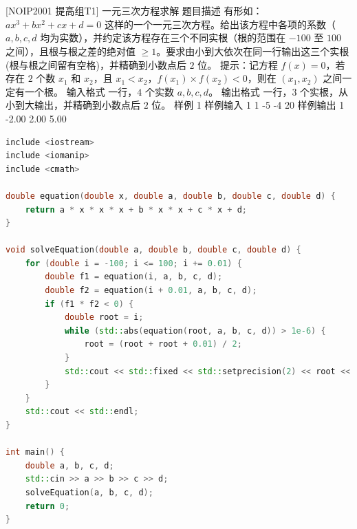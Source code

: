 \documentclass[12pt,twiside,a4paper]{ctexbook}
\numberwithin{chapter}{part}
\begin{document}
\section{}
 [NOIP2001 提高组T1] 一元三次方程求解
 题目描述
有形如：$a x^3 + b x^2 + c x + d = 0$  这样的一个一元三次方程。给出该方程中各项的系数（$a,b,c,d$ 均为实数），并约定该方程存在三个不同实根（根的范围在 $-100$ 至 $100$ 之间），且根与根之差的绝对值 $\ge 1$。要求由小到大依次在同一行输出这三个实根(根与根之间留有空格)，并精确到小数点后 $2$ 位。
提示：记方程 $f(x) = 0$，若存在 $2$ 个数 $x_1$ 和 $x_2$，且 $x_1 < x_2$，$f(x_1) \times f(x_2) < 0$，则在 $(x_1, x_2)$ 之间一定有一个根。
 输入格式
一行，$4$ 个实数 $a, b, c, d$。
 输出格式
一行，$3$ 个实根，从小到大输出，并精确到小数点后 $2$ 位。
 样例 1
 样例输入 1
1 -5 -4 20
 样例输出 1
-2.00 2.00 5.00
\begin{lstlisting}[language=c++,breaklines=true]
include <iostream>
include <iomanip>
include <cmath>

double equation(double x, double a, double b, double c, double d) {
    return a * x * x * x + b * x * x + c * x + d;
}

void solveEquation(double a, double b, double c, double d) {
    for (double i = -100; i <= 100; i += 0.01) {
        double f1 = equation(i, a, b, c, d);
        double f2 = equation(i + 0.01, a, b, c, d);
        if (f1 * f2 < 0) {
            double root = i;
            while (std::abs(equation(root, a, b, c, d)) > 1e-6) {
                root = (root + root + 0.01) / 2;
            }
            std::cout << std::fixed << std::setprecision(2) << root << " ";
        }
    }
    std::cout << std::endl;
}

int main() {
    double a, b, c, d;
    std::cin >> a >> b >> c >> d;
    solveEquation(a, b, c, d);
    return 0;
}
\end{lstlisting}
\end{document}
